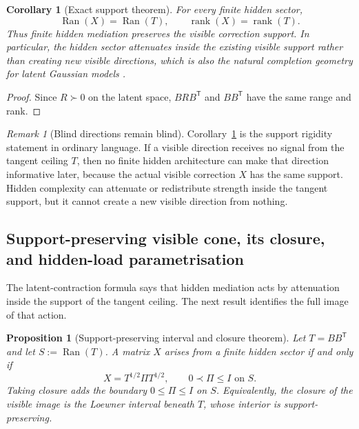 \documentclass[11pt]{article}
\numberwithin{equation}{section}
\DeclareMathOperator{\rank}{rank}
\theoremstyle{thmcompact}
\newtheorem{proposition}[theorem]{Proposition}
\newtheorem{corollary}[theorem]{Corollary}
\theoremstyle{remark}
\newtheorem*{remarkplain}{Remark}
\newenvironment{remark}[1][]%
{\begin{remarkbox}\begin{remarkplain}[#1]\normalfont}
		{\end{remarkplain}\end{remarkbox}}
\begin{document}
\begin{corollary}[Exact support theorem]\label{cor:support-theorem}
For every finite hidden sector,
\begin{equation}\label{eq:support-theorem}
\operatorname{Ran}(X)=\operatorname{Ran}(T),
\qquad
\rank(X)=\rank(T).
\end{equation}
Thus finite hidden mediation preserves the visible correction support. In particular, the hidden sector attenuates inside the existing visible support rather than creating new visible directions, which is also the natural completion geometry for latent Gaussian models \cite{GroneJohnsonSaWolkowicz1984,ChandrasekaranParriloWillsky2012}.
\end{corollary}

\begin{proof}
Since $R\succ 0$ on the latent space, $BRB^{\mathsf T}$ and $BB^{\mathsf T}$ have the same range and rank.
\end{proof}

\begin{remark}[Blind directions remain blind]
Corollary~\ref{cor:support-theorem} is the support rigidity statement in ordinary language. If a visible direction receives no signal from the tangent ceiling $T$, then no finite hidden architecture can make that direction informative later, because the actual visible correction $X$ has the same support. Hidden complexity can attenuate or redistribute strength inside the tangent support, but it cannot create a new visible direction from nothing.
\end{remark}

\subsection{Support-preserving visible cone, its closure, and hidden-load parametrisation}

The latent-contraction formula says that hidden mediation acts by attenuation inside the support of the tangent ceiling. The next result identifies the full image of that action.

\begin{proposition}[Support-preserving interval and closure theorem]\label{prop:interval}
Let $T=BB^{\mathsf T}$ and let $S:=\operatorname{Ran}(T)$. A matrix $X$ arises from a finite hidden sector if and only if
\begin{equation}\label{eq:interval-form}
X=T^{1/2}\Pi T^{1/2},
\qquad 0\prec \Pi\le I \text{ on } S.
\end{equation}
Taking closure adds the boundary $0\le \Pi\le I$ on $S$. Equivalently, the closure of the visible image is the Loewner interval beneath $T$, whose interior is support-preserving.
\end{proposition}
\end{document}
